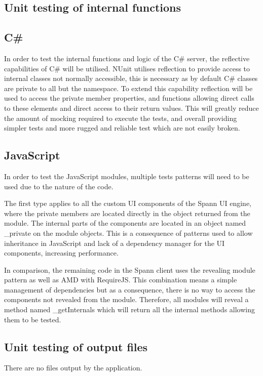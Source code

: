 \documentclass[12pt, titlepage]{article}
\begin{document}
\subsection{Unit testing of internal functions}

\subsection{C\#}
In order to test the internal functions and logic of the C\# server, the
reflective capabilities of C\# will be utilised. NUnit utilises reflection to
provide access to internal classes not normally accessible, this is necessary
as by default C\# classes are private to all but the namespace. To extend this
capability reflection will be used to access the private member properties, and
functions allowing direct calls to these elements and direct access to their
return values. This will greatly reduce the amount of mocking required to
execute the tests, and overall providing simpler tests and more rugged and
reliable test which are not easily broken. 

\subsection{JavaScript} In order to test the JavaScript modules, multiple tests
patterns will need to be used due to the nature of the code. 

The first type applies to all the custom UI components of the Spann UI engine,
where the private members are located directly in the object returned from the
module. The internal parts of the components are located in an object named
\_private on the module objects. This is a consequence of patterns used to allow
inheritance in JavaScript and lack of a dependency manager for the UI
components, increasing performance.  

In comparison, the remaining code in the Spann client uses the revealing module
pattern as well as AMD with RequireJS. This combination means a simple
management of dependencies but as a consequence, there is no way to access the
components not revealed from the module. Therefore, all modules will reveal a
method named \_getInternals which will return all the internal methods allowing
them to be tested. 

		
\subsection{Unit testing of output files}		
There are no files output by the application.
\end{document}
